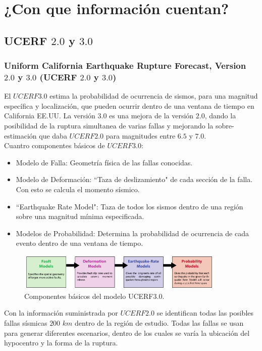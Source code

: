 \documentclass{beamer}
\begin{document}
\section{¿Con que información cuentan?}
\subsection{UCERF $2.0$ y $3.0$}
\begin{frame}[allowframebreaks]
\frametitle{Uniform California Earthquake Rupture Forecast, Version $2.0$ y $3.0$ (UCERF $2.0$ y $3.0$)}
%
\justifying
%
El $UCERF3.0$ estima la probabilidad de ocurrencia de sismos, para una magnitud específica y localización, que pueden ocurrir dentro de una ventana de tiempo en California EE.UU. La versión $3.0$ es una mejora de la versión $2.0$, dando la posibilidad de la ruptura simultanea de varias fallas y mejorando la sobre-estimación que daba $UCERF2.0$ para magnitudes entre $6.5$ y $7.0$.\\
%
Cuantro componentes básicos de $UCERF3.0$:
%
	\begin{itemize}
	\justifying
		\item Modelo de Falla: Geometría física de las fallas conocidas.
		\item Modelo de Deformación: ``Taza de deslizamiento" de cada sección de la falla. Con esto se calcula el momento sísmico.
		\item ``Earthquake Rate Model": Taza de todos los sismos dentro de una región sobre una magnitud mínima especificada.
		\item Modelos de Probabilidad: Determina la probabilidad de ocurrencia de cada evento dentro de una ventana de tiempo.
	\end{itemize}
%
\begin{figure}[h]
	\centering
	\includegraphics[height=1.75cm]{img/Components_UCERF.png}
	\caption{Componentes básicos del modelo UCERF3.0. \cite[figura 2, página 7]{ucerf3}}
\end{figure}
%
%
Con la información suministrada por $UCERF2.0$ se identifican todas las posibles fallas sísmicas $200$ $km$ dentro de la región de estudio. Todas las fallas se usan para generar diferentes escenarios, dentro de los cuales se varía la ubicación del hypocentro y la forma de la ruptura.\\

\end{frame}
\end{document}

